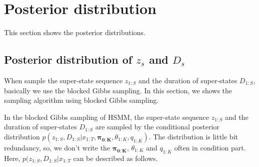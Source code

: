 \documentclass[a4paper]{article}
\begin{document}
\section{Posterior distribution}
This section shows the posterior distributions.

\subsection{Posterior distribution of $z_s$ and $D_s$}
When sample the super-state sequence $z_{1:S}$ and the duration of super-states $D_{1:S}$, basically we use the blocked Gibbs sampling.
In this section, we shows the sampling algorithm using blocked Gibbs sampling.
\par
In the blocked Gibbs sampling of HSMM, the super-state sequence $z_{1:S}$ and   the duration of super-states $D_{1:S}$ are sampled by the conditional posterior distribution $p(z_{1:S} , D_{1:S}| x_{1:T}, \boldsymbol{\pi_{0:K}}, \theta_{1:K}, q_{1:K})$.
The distribution is little bit redundancy, so, we don't write the $\boldsymbol{\pi_{0:K}}$, $\theta_{1:K}$ and $q_{1:K}$ often in condition part.
Here, $p(z_{1:S} , D_{1:S}| x_{1:T}$ can be described as follows.
\end{document}
